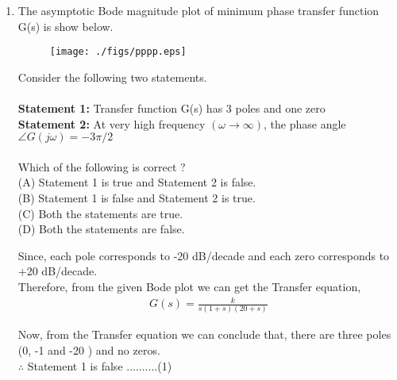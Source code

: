 \begin{enumerate}[label=\thesection.\arabic*.,ref=\thesection.\theenumi]
\item 
The asymptotic Bode magnitude plot of  minimum phase transfer function
G(s) is show below.\\
\begin{figure}[htp]
	\centering
	\texttt{[image: ./figs/pppp.eps]}
	\caption{}
	\label{fig:galaxy}
\end{figure} 
Consider the following two statements.\\ \\
 \textbf{Statement 1:} Transfer function G(s) has 3 poles and one zero \\
 \textbf{ Statement 2:} At very high frequency $(\omega \to \infty)$, the phase angle $ \angle G(j\omega)=-3\pi/2$ \\ \\
Which of the following is correct ? \\
(A) Statement 1 is true and Statement 2 is false.\\
(B) Statement 1 is false and Statement 2 is true.\\
(C) Both the statements are true.\\
(D) Both the statements are false.\\


\solution

Since, each pole corresponds to -20 dB/decade  
and each zero corresponds to +20 dB/decade.\\
Therefore, from the given Bode plot we can get the Transfer equation,
\begin{align}
G(s) = \frac{k}{s(1+s)(20+s)}
\end{align}

Now, from the Transfer equation we can conclude that,
there are three poles (0, -1 and -20 ) and no zeros.\\

$\therefore$ Statement 1 is false  ..........(1)\\ \\



\end{enumerate}

